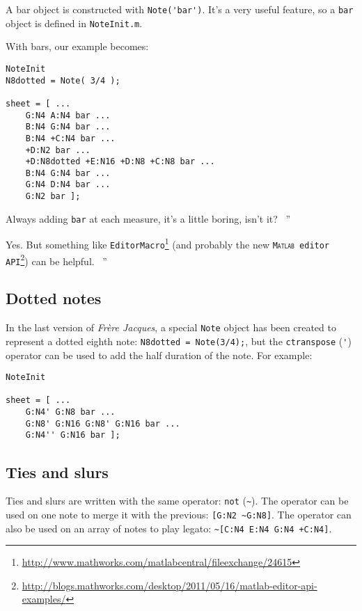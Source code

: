 \documentclass{article}
\newcommand\matlab{\textsc{Matlab}\xspace}
\newcommand\note{\lstinline!Note!\xspace}
\newcommand\frerejaques{\emph{Fr\`ere Jacques}\xspace}
\newcommand\noteInitFile{\texttt{NoteInit.m}\xspace}
\newcommand\exchange[2]{\texttt{#1}\footnote{\url{#2}}\xspace}
\newenvironment{meenv}{ \par \noindent \makebox[6em][r]{ \textcolor{mecolor}{Me}: `` --~}}{~''}
\newenvironment{myselfenv}{ \par \noindent \makebox[6em][r]{ \textcolor{myselfcolor}{Myself}: `` --~}}{~''}
\newcommand{ \me }[1]{%
\begin{meenv}%
	#1%
\end{meenv} }
\newcommand{ \myself }[1]{%
\begin{myselfenv}%
	#1%
\end{myselfenv} }
\begin{document}
A bar object is constructed with \lstinline!Note('bar')!. It's a very useful feature, so a \lstinline!bar! object is defined in \noteInitFile.

With bars, our example becomes:
\begin{lstlisting}
NoteInit
N8dotted = Note( 3/4 );

sheet = [ ...
	G:N4 A:N4 bar ...
	B:N4 G:N4 bar ...
	B:N4 +C:N4 bar ...
	+D:N2 bar ...
	+D:N8dotted +E:N16 +D:N8 +C:N8 bar ...
	B:N4 G:N4 bar ...
	G:N4 D:N4 bar ...
	G:N2 bar ];
\end{lstlisting}

\me{Always adding \lstinline!bar! at each measure, it's a little boring, isn't it?}
\myself{Yes. But something like \exchange{EditorMacro}{http://www.mathworks.com/matlabcentral/fileexchange/24615} (and probably the new \exchange{\matlab editor API}{http://blogs.mathworks.com/desktop/2011/05/16/matlab-editor-api-examples/}) can be helpful.}

\subsection{Dotted notes}
\label{sec:TutoDottedNotes}

In the last version of \frerejaques, a special \note object has been created to represent a dotted eighth note: \lstinline!N8dotted = Note(3/4);!, but the \lstinline!ctranspose! (\lstinline!'!) operator can be used to add the half duration of the note. For example: \\

\begin{lstlisting}
NoteInit

sheet = [ ...
	G:N4' G:N8 bar ...
	G:N8' G:N16 G:N8' G:N16 bar ...
	G:N4'' G:N16 bar ];
\end{lstlisting}

\subsection{Ties and slurs}

Ties and slurs are written with the same operator: \lstinline!not! (\lstinline!~!). The operator can be used on one note to merge it with the previous: \lstinline![G:N2 ~G:N8]!. The operator can also be used on an array of notes to play legato: \lstinline!~[C:N4 E:N4 G:N4 +C:N4]!.
\end{document}
